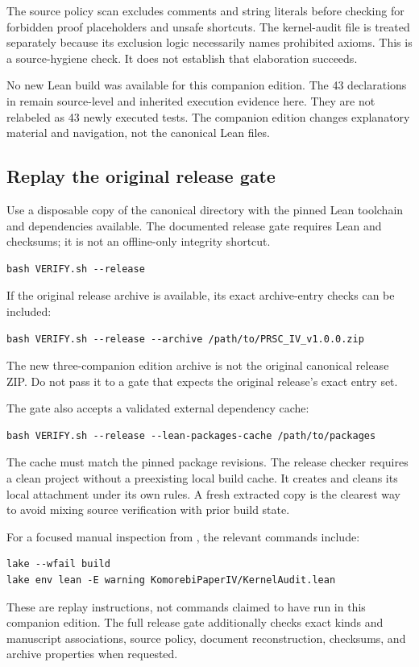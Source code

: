 The source policy scan excludes comments and string literals before checking for forbidden proof placeholders and unsafe shortcuts. The kernel-audit file is treated separately because its exclusion logic necessarily names prohibited axioms. This is a source-hygiene check. It does not establish that elaboration succeeds.

No new Lean build was available for this companion edition. The 43 declarations in  remain source-level and inherited execution evidence here. They are not relabeled as 43 newly executed tests. The companion edition changes explanatory material and navigation, not the canonical Lean files.

\subsection{Replay the original release gate}
Use a disposable copy of the canonical  directory with the pinned Lean toolchain and dependencies available. The documented release gate requires Lean and checksums; it is not an offline-only integrity shortcut.
\begin{Verbatim}[fontsize=\small,breaklines=true,breakanywhere=true]
bash VERIFY.sh --release
\end{Verbatim}
If the original release archive is available, its exact archive-entry checks can be included:
\begin{Verbatim}[fontsize=\small,breaklines=true,breakanywhere=true]
bash VERIFY.sh --release --archive /path/to/PRSC_IV_v1.0.0.zip
\end{Verbatim}
The new three-companion edition archive is not the original canonical release ZIP. Do not pass it to a gate that expects the original release's exact entry set.

The gate also accepts a validated external dependency cache:
\begin{Verbatim}[fontsize=\small,breaklines=true,breakanywhere=true]
bash VERIFY.sh --release --lean-packages-cache /path/to/packages
\end{Verbatim}
The cache must match the pinned package revisions. The release checker requires a clean project without a preexisting local build cache. It creates and cleans its local attachment under its own rules. A fresh extracted copy is the clearest way to avoid mixing source verification with prior build state.

For a focused manual inspection from , the relevant commands include:
\begin{Verbatim}[fontsize=\small,breaklines=true,breakanywhere=true]
lake --wfail build
lake env lean -E warning KomorebiPaperIV/KernelAudit.lean
\end{Verbatim}
These are replay instructions, not commands claimed to have run in this companion edition. The full release gate additionally checks exact kinds and manuscript associations, source policy, document reconstruction, checksums, and archive properties when requested.

